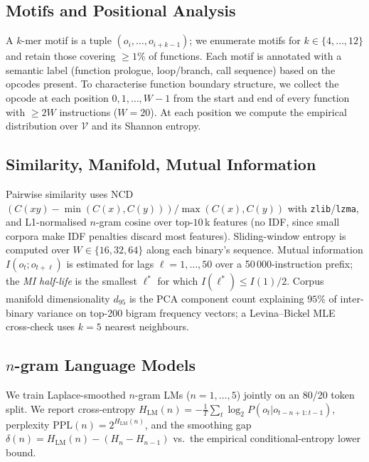 \documentclass[conference]{IEEEtran}
\newcommand{\zlib}{\texttt{zlib}}
\newcommand{\lzma}{\texttt{lzma}}
\begin{document}
\subsection{Motifs and Positional Analysis}
A $k$-mer motif is a tuple $(o_i,\dots,o_{i+k-1})$; we enumerate motifs
for $k{\in}\{4,\dots,12\}$ and retain those covering ${\geq}1\%$ of
functions.  Each motif is annotated with a semantic label (function
prologue, loop/branch, call sequence) based on the opcodes present.  To
characterise function boundary structure, we collect the opcode at each
position $0,1,\dots,W{-}1$ from the start and end of every function with
${\geq}2W$ instructions ($W{=}20$).  At each position we compute the
empirical distribution over $\mathcal{V}$ and its Shannon entropy.

\subsection{Similarity, Manifold, Mutual Information}
Pairwise similarity uses NCD
$(C(xy)-\min(C(x),C(y)))/\max(C(x),C(y))$ with \zlib{}/\lzma{}, and
L1-normalised $n$-gram cosine over top-$10$\,k features (no IDF, since
small corpora make IDF penalties discard most features).
Sliding-window entropy is computed over $W{\in}\{16,32,64\}$ along each
binary's sequence.
Mutual information $I(o_t;o_{t+\ell})$ is estimated for lags
$\ell{=}1,\dots,50$ over a 50\,000-instruction prefix; the
\emph{MI half-life} is the smallest $\ell^*$ for which
$I(\ell^*){\leq}I(1)/2$.
Corpus manifold dimensionality $d_{95}$ is the PCA component count
explaining $95\%$ of inter-binary variance on top-200 bigram frequency
vectors; a Levina--Bickel MLE~\cite{levina2005mle} cross-check uses $k{=}5$
nearest neighbours.

\subsection{$n$-gram Language Models}
We train Laplace-smoothed $n$-gram LMs ($n{=}1,\dots,5$) jointly on an
80/20 token split.  We report cross-entropy
$H_{\mathrm{LM}}(n){=}-\tfrac{1}{T}\sum_t\log_2 P(o_t|o_{t-n+1:t-1})$,
perplexity $\mathrm{PPL}(n){=}2^{H_{\mathrm{LM}}(n)}$, and the smoothing
gap $\delta(n){=}H_{\mathrm{LM}}(n)-(H_n-H_{n-1})$ vs.\ the empirical
conditional-entropy lower bound.
\end{document}
